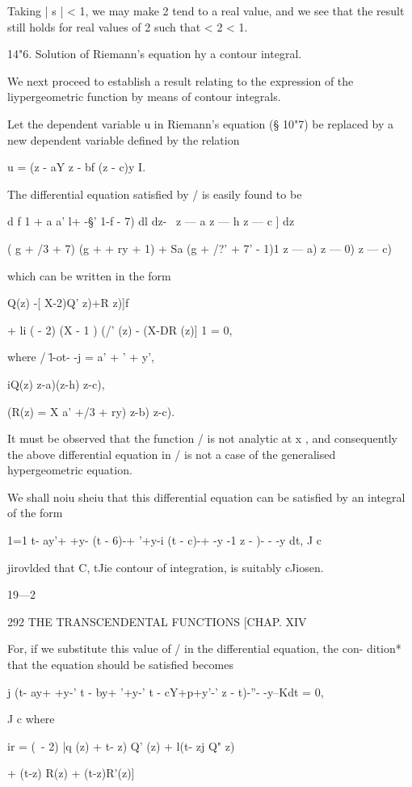 Taking | s | < 1, we may make 2 tend to a real value, and we see that
the result still holds for real values of 2 such that < 2 < 1.

14"6. Solution of Riemann's equation hy a contour integral.

We next proceed to establish a result relating to the expression of
the liypergeometric function by means of contour integrals.

Let the dependent variable u in Riemann's equation (§ 10"7) be
replaced by a new dependent variable defined by the relation

u = (z - aY z - bf (z - c)y I.

The differential equation satisfied by / is easily found to be

d f 1 + a a' l+ -§' 1-f - 7) dl dz- \ z — a z — h z — c ] dz

( g + /3 + 7) (g + + ry + 1) + Sa (g + /?' + 7' - 1)1 z — a) z — 0) z
— c)

which can be written in the form

Q(z) -[ X-2)Q' z)+R z)]f

+ li ( - 2) (X - 1 ) (/' (z) - (X-DR (z)] 1 = 0,

where / \=l-ot- -j = a' + ' + y',

iQ(z) z-a)(z-h) z-c),

(R(z) = X a' +/3 + ry) z-b) z-c).

It must be observed that the function / is not analytic at x , and
consequently the above differential equation in / is not a case of the
generalised hypergeometric equation.

We shall noiu sheiu that this differential equation can be satisfied
by an integral of the form

1=1 t- ay'+ +y- (t - 6)-+ '+y-i (t - c)-+ -y -1 z - )- - -y dt, J c

jirovlded that C, tJie contour of integration, is suitably cJiosen.

19—2

292 THE TRANSCENDENTAL FUNCTIONS [CHAP. XIV

For, if we substitute this value of / in the differential equation,
the con- dition* that the equation should be satisfied becomes

j (t- ay+ +y-' t - by+ '+y-' t - cY+p+y'-' z - t)-''- -y--Kdt = 0,

J c where

ir = (\ - 2) |q (z) + t- z) Q' (z) + l(t- zj Q" z)

+ (t-z) R(z) + (t-z)R'(z)]

